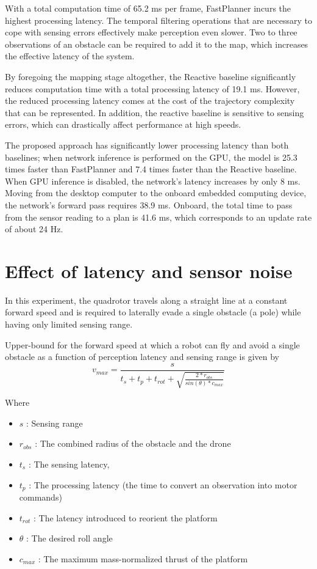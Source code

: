 With a total computation time of 65.2 ms per frame, FastPlanner\cite{fastPlanner} incurs the highest processing latency. The temporal filtering operations that are necessary to cope with sensing errors effectively make perception even slower. Two to three observations of an obstacle can be required to add it to the map, which increases the effective latency of the system. 

By foregoing the mapping stage altogether, the Reactive\cite{reactive_method} baseline significantly reduces computation time with a total processing latency of 19.1 ms. However, the reduced processing latency comes at the cost of the trajectory complexity that can be represented. In addition, the reactive\cite{reactive_method} baseline is sensitive to sensing errors, which can drastically affect performance at high speeds.
 

The proposed approach has significantly lower processing latency than both baselines; when network inference is performed on the GPU, the model is 25.3 times faster than FastPlanner\cite{fastPlanner} and 7.4 times faster than the Reactive baseline. When GPU inference is disabled, the network’s latency increases by only 8 ms. Moving from the desktop computer to the onboard embedded computing device, the network’s forward pass requires 38.9 ms. Onboard, the total time to pass from the sensor
reading to a plan is 41.6 ms, which corresponds to an update rate of about 24 Hz.


\section{Effect of latency and sensor noise}
In this experiment, the quadrotor travels along a straight line at a constant forward speed and is required to laterally evade a single obstacle (a pole) while having only limited sensing range. 

Upper-bound for the forward speed at which a robot can fly and avoid a single obstacle as a function of perception latency and sensing range is given by
\begin{equation}
	v_{max} = \frac{s}{t_s + t_p + t_{rot} + \sqrt{\frac{2*r_{obs}}{sin(\theta)*c_{max}}}}
\end{equation}

Where
\begin{itemize}
	\item $s$ : Sensing range
	\item $r_{obs}$ : The combined radius of the obstacle and the drone
	\item $t_s$ : The sensing latency,
	\item $t_p$ : The processing latency (the time to convert an observation into motor commands)
	\item $t_{rot}$ : The latency introduced to reorient the platform
	\item $\theta$ : The desired roll angle
	\item $c_{max}$ : The maximum mass-normalized thrust of the platform
\end{itemize}

